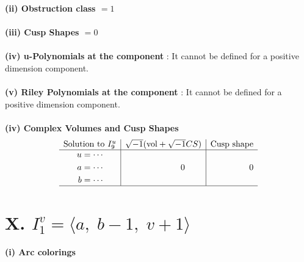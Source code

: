 \documentclass[1p]{elsarticle_modified}
\theoremstyle{definition}
\newcommand{\I}{\sqrt{-1}}
\begin{document}
\flushleft \textbf{(ii) Obstruction class $= 1$}\\~\\
\flushleft \textbf{(iii) Cusp Shapes $= 0$}\\~\\
\flushleft \textbf{(iv) u-Polynomials at the component} : It cannot be defined for a positive dimension component.\\~\\
\flushleft \textbf{(v) Riley Polynomials at the component} : It cannot be defined for a positive dimension component.\\~\\
\newpage\flushleft \textbf{(iv) Complex Volumes and Cusp Shapes}
$$\begin{array}{c|c|c} 
\text{Solution to }I^u_{9}& \I (\text{vol} + \sqrt{-1}CS) & \text{Cusp shape}\\
 \hline 
\begin{aligned}
u &= \cdots \\
a &= \cdots \\
b &= \cdots\end{aligned}
 & \phantom{-0.000000 } 0 & \phantom{-0.000000 } 0\\
 \hline 
 \end{array}
$$\newpage\renewcommand{\arraystretch}{1}
\centering \section*{X. $I^v_{1}= \langle a,\;b-1,\;v+1 \rangle$}
\flushleft \textbf{(i) Arc colorings}\\
\end{document}
